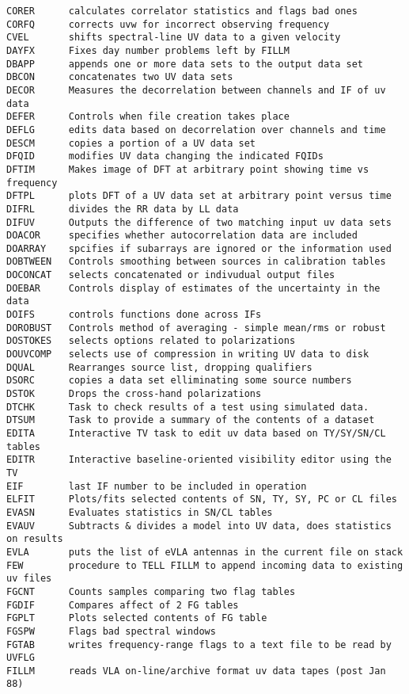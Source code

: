 \begin{verbatim}
CORER      calculates correlator statistics and flags bad ones
CORFQ      corrects uvw for incorrect observing frequency
CVEL       shifts spectral-line UV data to a given velocity
DAYFX      Fixes day number problems left by FILLM
DBAPP      appends one or more data sets to the output data set
DBCON      concatenates two UV data sets
DECOR      Measures the decorrelation between channels and IF of uv data
DEFER      Controls when file creation takes place
DEFLG      edits data based on decorrelation over channels and time
DESCM      copies a portion of a UV data set
DFQID      modifies UV data changing the indicated FQIDs
DFTIM      Makes image of DFT at arbitrary point showing time vs frequency
DFTPL      plots DFT of a UV data set at arbitrary point versus time
DIFRL      divides the RR data by LL data
DIFUV      Outputs the difference of two matching input uv data sets
DOACOR     specifies whether autocorrelation data are included
DOARRAY    spcifies if subarrays are ignored or the information used
DOBTWEEN   Controls smoothing between sources in calibration tables
DOCONCAT   selects concatenated or indivudual output files
DOEBAR     Controls display of estimates of the uncertainty in the data
DOIFS      controls functions done across IFs
DOROBUST   Controls method of averaging - simple mean/rms or robust
DOSTOKES   selects options related to polarizations
DOUVCOMP   selects use of compression in writing UV data to disk
DQUAL      Rearranges source list, dropping qualifiers
DSORC      copies a data set elliminating some source numbers
DSTOK      Drops the cross-hand polarizations
DTCHK      Task to check results of a test using simulated data.
DTSUM      Task to provide a summary of the contents of a dataset
EDITA      Interactive TV task to edit uv data based on TY/SY/SN/CL tables
EDITR      Interactive baseline-oriented visibility editor using the TV
EIF        last IF number to be included in operation
ELFIT      Plots/fits selected contents of SN, TY, SY, PC or CL files
EVASN      Evaluates statistics in SN/CL tables
EVAUV      Subtracts & divides a model into UV data, does statistics on results
EVLA       puts the list of eVLA antennas in the current file on stack
FEW        procedure to TELL FILLM to append incoming data to existing uv files
FGCNT      Counts samples comparing two flag tables
FGDIF      Compares affect of 2 FG tables
FGPLT      Plots selected contents of FG table
FGSPW      Flags bad spectral windows
FGTAB      writes frequency-range flags to a text file to be read by UVFLG
FILLM      reads VLA on-line/archive format uv data tapes (post Jan 88)

\end{verbatim}
